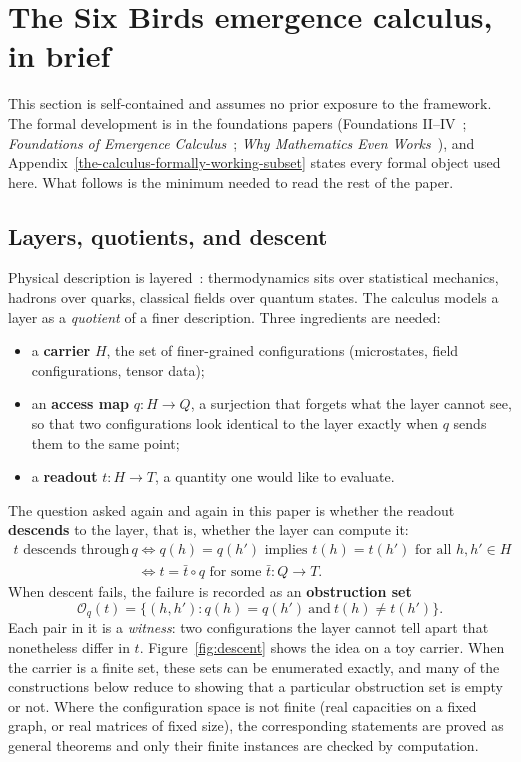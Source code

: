 \section{The Six Birds emergence calculus, in brief}\label{the-six-birds-emergence-calculus-in-brief}

This section is self-contained and assumes no prior exposure to the framework. The formal development is in the
foundations papers (Foundations II--IV~\citep{Tsiokos_FoundationsII,Tsiokos_FoundationsIII,Tsiokos_FoundationsIV};
\emph{Foundations of Emergence Calculus}~\citep{Tsiokos_FoEC}; \emph{Why Mathematics Even Works}~\citep{Tsiokos_WhyMath}),
and Appendix~\ref{the-calculus-formally-working-subset} states every formal object used here. What follows is the
minimum needed to read the rest of the paper.

\subsection{Layers, quotients, and descent}\label{layers-quotients-and-descent}

Physical description is layered~\citep{Anderson1972}: thermodynamics sits over statistical mechanics, hadrons over
quarks, classical fields over quantum states. The calculus models a layer as a \emph{quotient} of a finer description.
Three ingredients are needed:

\begin{itemize}\tightlist
\item a \textbf{carrier} \(H\), the set of finer-grained configurations (microstates, field configurations, tensor data);
\item an \textbf{access map} \(q:H\to Q\), a surjection that forgets what the layer cannot see, so that two
  configurations look identical to the layer exactly when \(q\) sends them to the same point;
\item a \textbf{readout} \(t:H\to T\), a quantity one would like to evaluate.
\end{itemize}

The question asked again and again in this paper is whether the readout \textbf{descends} to the layer, that is,
whether the layer can compute it:
\begin{align*}
t \text{ descends through } q
&\iff q(h)=q(h') \text{ implies } t(h)=t(h') \text{ for all } h,h'\in H\\
&\iff t=\bar t\circ q \text{ for some } \bar t:Q\to T .
\end{align*}
When descent fails, the failure is recorded as an \textbf{obstruction set}
\[
\mathcal O_q(t)=\{(h,h') : q(h)=q(h')\ \text{and}\ t(h)\neq t(h')\}.
\]
Each pair in it is a \emph{witness}: two configurations the layer cannot tell apart that nonetheless differ in \(t\).
Figure~\ref{fig:descent} shows the idea on a toy carrier. When the carrier is a finite set, these sets can be enumerated exactly, and many of the constructions below reduce
to showing that a particular obstruction set is empty or not. Where the configuration space is not finite (real
capacities on a fixed graph, or real matrices of fixed size), the corresponding statements are proved as general
theorems and only their finite instances are checked by computation.


